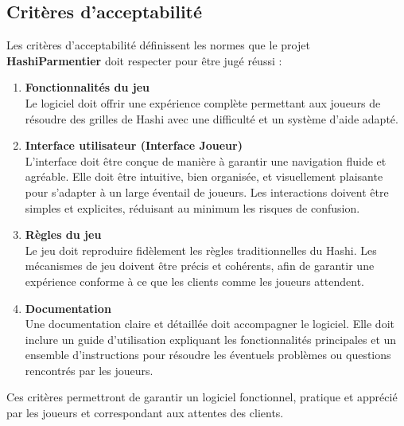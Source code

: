\subsection{Critères d’acceptabilité}
Les critères d’acceptabilité définissent les normes que le projet \textbf{HashiParmentier} doit respecter pour être jugé réussi :

\begin{enumerate}[label=\textbf{\arabic*.}, leftmargin=1.5cm]

    \item \textbf{Fonctionnalités du jeu} \\
    Le logiciel doit offrir une expérience complète permettant aux joueurs de résoudre des grilles de Hashi avec une difficulté et un système d'aide adapté. 
    \item \textbf{Interface utilisateur (Interface Joueur)} \\
    L’interface doit être conçue de manière à garantir une navigation fluide et agréable. Elle doit être intuitive, bien organisée, et visuellement plaisante pour s’adapter à un large éventail de joueurs. Les interactions doivent être simples et explicites, réduisant au minimum les risques de confusion.

    \item \textbf{Règles du jeu} \\
    Le jeu doit reproduire fidèlement les règles traditionnelles du Hashi. Les mécanismes de jeu doivent être précis et cohérents, afin de garantir une expérience conforme à ce que les clients comme les joueurs attendent.

    \item \textbf{Documentation} \\
    Une documentation claire et détaillée doit accompagner le logiciel. Elle doit inclure un guide d’utilisation expliquant les fonctionnalités principales et un ensemble d’instructions pour résoudre les éventuels problèmes ou questions rencontrés par les joueurs.

\end{enumerate}

Ces critères permettront de garantir un logiciel fonctionnel, pratique et apprécié par les joueurs et correspondant aux attentes des clients.